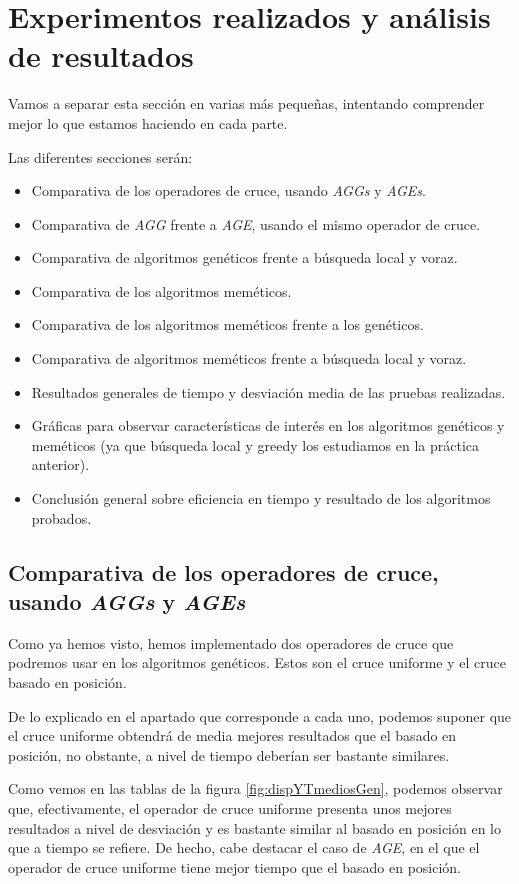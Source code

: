 \section{Experimentos realizados y análisis de resultados}


Vamos a separar esta sección en varias más pequeñas, intentando comprender mejor lo que estamos haciendo en cada parte.

Las diferentes secciones serán:

\begin{itemize}
\item Comparativa de los operadores de cruce, usando \textit{AGGs} y \textit{AGEs}.
\item Comparativa de \textit{AGG} frente a \textit{AGE}, usando el mismo operador de cruce.
\item Comparativa de algoritmos genéticos frente a búsqueda local y voraz.
\item Comparativa de los algoritmos meméticos.
\item Comparativa de los algoritmos meméticos frente a los genéticos.
\item Comparativa de algoritmos meméticos frente a búsqueda local y voraz.
\item Resultados generales de tiempo y desviación media de las pruebas realizadas.
\item Gráficas para observar características de interés en los algoritmos genéticos y meméticos (ya que búsqueda local y greedy los estudiamos en la práctica anterior).
\item Conclusión general sobre eficiencia en tiempo y resultado de los algoritmos probados.
\end{itemize}

\subsection{Comparativa de los operadores de cruce, usando \textit{AGGs} y \textit{AGEs}}

Como ya hemos visto, hemos implementado dos operadores de cruce que podremos usar en los algoritmos genéticos. Estos son el cruce uniforme y el cruce basado en posición.

De lo explicado en el apartado que corresponde a cada uno, podemos suponer que el cruce uniforme obtendrá de media mejores resultados que el basado en posición, no obstante, a nivel de tiempo deberían ser bastante similares.

Como vemos en las tablas de la figura \ref{fig:dispYTmediosGen}, podemos observar que, efectivamente, el operador de cruce uniforme presenta unos mejores resultados a nivel de desviación y es bastante similar al basado en posición en lo que a tiempo se refiere.
De hecho, cabe destacar el caso de \textit{AGE}, en el que el operador de cruce uniforme tiene mejor tiempo que el basado en posición.

